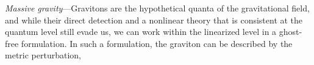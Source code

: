 \documentclass[prd,twocolumn,aps,psfig,nofootinbib,nobibnotes,superscriptaddress,preprintnumbers,times]{revtex4-2}
\begin{document}

\textit{Massive gravity}---Gravitons are the hypothetical quanta of the gravitational field, and while their direct detection and a nonlinear theory that is consistent at the quantum level still evade us, we can work within the linearized level in a ghost-free formulation. In such a formulation, the graviton can be described by the metric perturbation,
\end{document}
